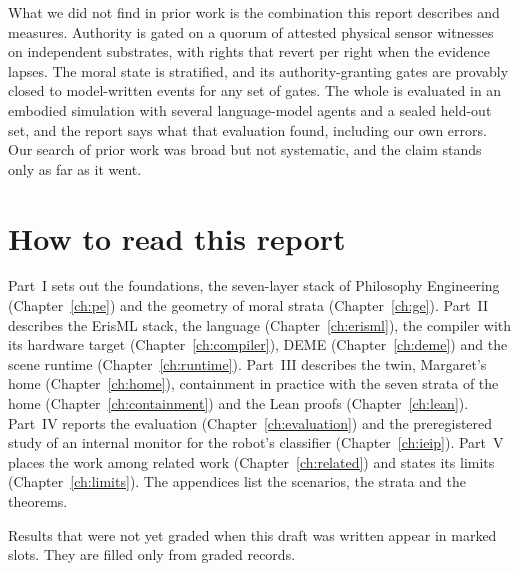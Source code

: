What we did not find in prior work is the combination this report describes and measures. Authority
is gated on a quorum of attested physical sensor witnesses on independent substrates, with rights
that revert per right when the evidence lapses. The moral state is stratified, and its
authority-granting gates are provably closed to model-written events for any set of gates. The
whole is evaluated in an embodied simulation with several language-model agents and a sealed
held-out set, and the report says what that evaluation found, including our own errors. Our search
of prior work was broad but not systematic, and the claim stands only as far as it went.

\section{How to read this report}

Part~I sets out the foundations, the seven-layer stack of Philosophy Engineering
(Chapter~\ref{ch:pe}) and the geometry of moral strata (Chapter~\ref{ch:ge}). Part~II describes the
ErisML stack, the language (Chapter~\ref{ch:erisml}), the compiler with its hardware target
(Chapter~\ref{ch:compiler}), DEME (Chapter~\ref{ch:deme}) and the scene runtime
(Chapter~\ref{ch:runtime}). Part~III describes the twin, Margaret's home (Chapter~\ref{ch:home}),
containment in practice with the seven strata of the home (Chapter~\ref{ch:containment}) and the
Lean proofs (Chapter~\ref{ch:lean}). Part~IV reports the evaluation (Chapter~\ref{ch:evaluation})
and the preregistered study of an internal monitor for the robot's classifier
(Chapter~\ref{ch:ieip}). Part~V places the work among related work (Chapter~\ref{ch:related}) and
states its limits (Chapter~\ref{ch:limits}). The appendices list the scenarios, the strata and the
theorems.

Results that were not yet graded when this draft was written appear in marked slots. They are
filled only from graded records.
